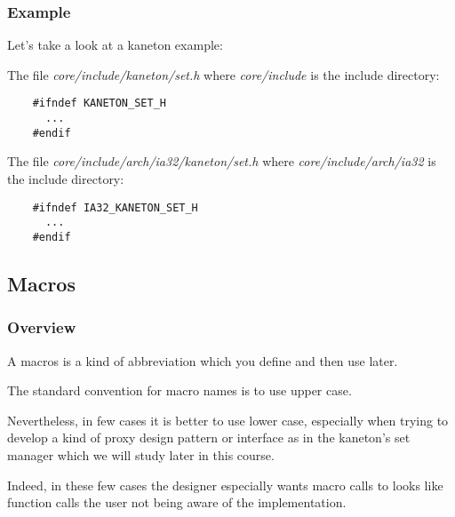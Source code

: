\begin{frame}[containsverbatim]
  \frametitle{Example}

  Let's take a look at a kaneton example:

  \nl

  The file \textit{core/include/kaneton/set.h} where \textit{core/include}
  is the include directory:

  \begin{verbatim}
    #ifndef KANETON_SET_H
      ...
    #endif
  \end{verbatim}

  The file \textit{core/include/arch/ia32/kaneton/set.h} where
  \textit{core/include/arch/ia32} is the include directory:

  \begin{verbatim}
    #ifndef IA32_KANETON_SET_H
      ...
    #endif
  \end{verbatim}
\end{frame}

%
%

\subsection{Macros}


\begin{frame}
  \frametitle{Overview}

  A macros is a kind of abbreviation which you define and then use later.

  \nl

  The standard convention for macro names is to use upper case.

  \nl

  Nevertheless, in few cases it is better to use lower case, especially
  when trying to develop a kind of proxy design pattern or interface as
  in the kaneton's set manager which we will study later in this course.

  \nl

  Indeed, in these few cases the designer especially wants macro calls
  to looks like function calls the user not being aware of the implementation.
\end{frame}


